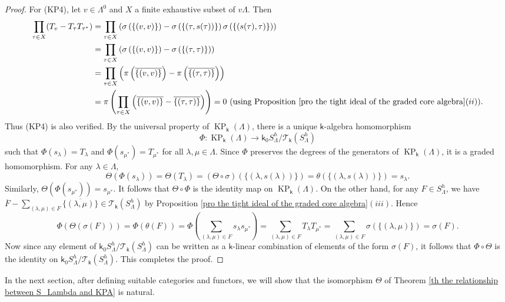 \documentclass[a4paper,reqno,11pt]{amsart}
\numberwithin{equation}{section}
\theoremstyle{definition}
\theoremstyle{remark}
\newcommand{\KP}{\operatorname{KP}}
\begin{document}
\begin{proof}
For (KP4), let $v\in \Lambda^0$ and $X$ a finite exhaustive subset of $v\Lambda$. Then 
\begin{align*}
\displaystyle{\prod_{\tau\in X}}(T_v-T_\tau T_{\tau^*})&=\displaystyle{\prod_{\tau\in X}}\left(\sigma\left(\{(v,v)\}\right)-\sigma\left(\{(\tau,s(\tau))\}\right)\sigma\left(\{(s(\tau),\tau)\}\right)\right)\\
&=\displaystyle{\prod_{\tau\in X}}\left(\sigma\left(\{(v,v)\}\right)-\sigma\left(\{(\tau,\tau)\}\right)\right)\\
&=\displaystyle{\prod_{\tau\in X}}\left(\pi\left(\overline{\{(v,v)\}}\right)-\pi\left(\overline{\{(\tau,\tau)\}}\right)\right)\\
&=\pi\left(\displaystyle{\prod_{\tau\in X}} \left(\overline{\{(v,v)\}}-\overline{\{(\tau,\tau)\}}\right)\right)=0~(\text{using Proposition \ref{pro the tight ideal of the graded core algebra}}(ii)).
\end{align*}
Thus (KP4) is also verified. By the universal property of $\KP_\mathsf{k}(\Lambda)$, there is a unique $\mathsf{k}$-algebra homomorphism \[\Phi:\KP_\mathsf{k}(\Lambda)\longrightarrow \mathsf{k}_0S_\Lambda^h/{\mathcal{T}_\mathsf{k}(S_\Lambda^h)}\] such that $\Phi(s_\lambda)=T_\lambda$ and $\Phi(s_{\mu^*})=T_{\mu^*}$ for all $\lambda,\mu\in \Lambda$. Since $\Phi$ preserves the degrees of the generators of $\KP_\mathsf{k}(\Lambda)$, it is a graded homomorphism. For any $\lambda\in \Lambda$, \[\Theta(\Phi(s_\lambda))=\Theta(T_\lambda)=(\Theta\circ \sigma)\left(\{(\lambda,s(\lambda))\}\right)=\theta\left(\{(\lambda,s(\lambda))\}\right)=s_\lambda.\] Similarly, $\Theta(\Phi(s_{\mu^*}))=s_{\mu^*}$. It follows that $\Theta\circ \Phi$ is the identity map on $\KP_\mathsf{k}(\Lambda)$. On the other hand, for any $F\in S_\Lambda^h$, we have $\overline{F}-\displaystyle{\sum_{(\lambda,\mu)\in F}}\overline{\{(\lambda,\mu)\}}\in \mathcal{T}_\mathsf{k}(S_\Lambda^h)$ by Proposition \ref{pro the tight ideal of the graded core algebra}$(iii)$. Hence \[\Phi(\Theta(\sigma(F)))=\Phi(\theta(F))=\Phi\left(\displaystyle{\sum_{(\lambda,\mu)\in F}}s_\lambda s_{\mu^*}\right)=\displaystyle{\sum_{(\lambda,\mu)\in F}}T_\lambda T_{\mu^*}
=\displaystyle{\sum_{(\lambda,\mu)\in F}}\sigma\left(\{(\lambda,\mu)\}\right)=\sigma(F).\]
Now since any element of $\mathsf{k}_0S_\Lambda^h/{\mathcal{T}_\mathsf{k}(S_\Lambda^h)}$ can be written as a $\mathsf{k}$-linear combination of elements of the form $\sigma(F)$, it follows that $\Phi\circ \Theta$ is the identity on $\mathsf{k}_0S_\Lambda^h/{\mathcal{T}_\mathsf{k}(S_\Lambda^h)}$. This completes the proof.
\end{proof}
In the next section, after defining suitable categories and functors, we will show that the isomorphism $\Theta$ of Theorem \ref{th the relationship between S_Lambda and KPA} is natural.
\end{document}
